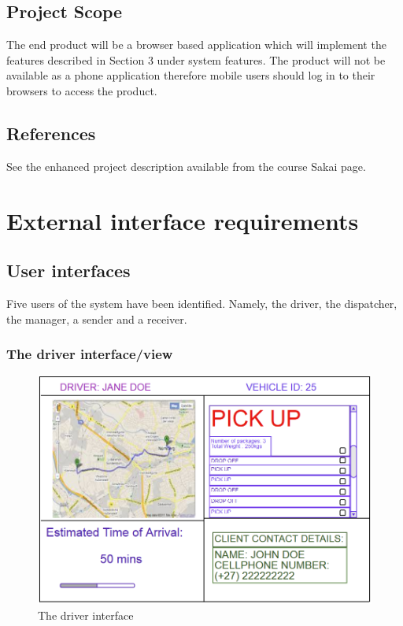 \documentclass[paper=a4, fontsize=11pt]{scrartcl} %
\numberwithin{equation}{section} %
\numberwithin{figure}{section} %
\numberwithin{table}{section} %
\begin{document}
\subsection{Project Scope}
The end product will be a browser based application which will implement the features described in Section 3 under system features. The product will not be available as a phone application therefore mobile users should log in to their browsers to access the product. 

\subsection{References}
See the enhanced project description available from the course Sakai page.


\section{External interface requirements}
\subsection{User interfaces}
Five users of the system have been identified. Namely, the driver, the dispatcher, the manager, a sender and a receiver.

\subsubsection{The driver interface/view}
\begin{figure}[ht!]
\centering
\includegraphics[width=5in]{pictures/driver.png}
\caption{The driver interface}
\label{Driver}
\end{figure}
\end{document}
